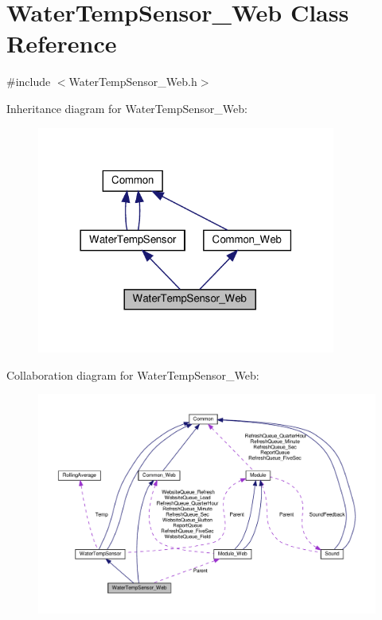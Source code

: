 \hypertarget{class_water_temp_sensor___web}{}\section{Water\+Temp\+Sensor\+\_\+\+Web Class Reference}
\label{class_water_temp_sensor___web}


{\ttfamily \#include $<$Water\+Temp\+Sensor\+\_\+\+Web.\+h$>$}



Inheritance diagram for Water\+Temp\+Sensor\+\_\+\+Web\+:
\nopagebreak
\begin{figure}[H]
\begin{center}
\leavevmode
\includegraphics[width=278pt]{class_water_temp_sensor___web__inherit__graph}
\end{center}
\end{figure}


Collaboration diagram for Water\+Temp\+Sensor\+\_\+\+Web\+:
\nopagebreak
\begin{figure}[H]
\begin{center}
\leavevmode
\includegraphics[width=350pt]{class_water_temp_sensor___web__coll__graph}
\end{center}
\end{figure}
